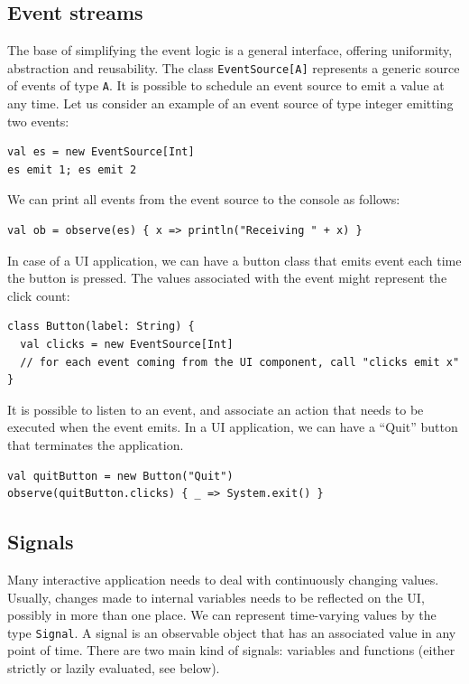 \subsection{Event streams}

The base of simplifying the event logic is a general interface, offering uniformity, abstraction and reusability. The class {\tt EventSource[A]} represents a generic source of events of type {\tt A}. It is possible to schedule an event source to emit a value at any time. Let us consider an example of an event source of type integer emitting two events:
\begin{lstlisting}
val es = new EventSource[Int]
es emit 1; es emit 2
\end{lstlisting}

We can print all events from the event source to the console as follows:
\begin{lstlisting}
val ob = observe(es) { x => println("Receiving " + x) }
\end{lstlisting}

In case of a UI application, we can have a button class that emits event each time the button is pressed. The values associated with the event might represent the click count:

\begin{lstlisting}
class Button(label: String) {
  val clicks = new EventSource[Int]
  // for each event coming from the UI component, call "clicks emit x"
}
\end{lstlisting}

It is possible to listen to an event, and associate an action that needs to be executed when the event emits. In a UI application, we can have a ``Quit'' button that terminates the application.
\begin{lstlisting}
val quitButton = new Button("Quit")
observe(quitButton.clicks) { _ => System.exit() }
\end{lstlisting}

\subsection{Signals}

Many interactive application needs to deal with continuously changing values. Usually, changes made to internal variables needs to be reflected on the UI, possibly in more than one place. We can represent time-varying values by the type \texttt{Signal}. A signal is an observable object that has an associated value in any point of time. There are two main kind of signals: variables and functions (either strictly or lazily evaluated, see below).

